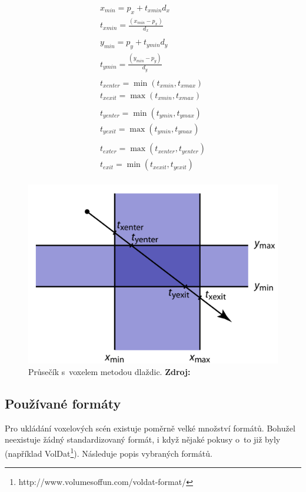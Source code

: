 \begin{equation} \label{eq:slabs}
	\begin{gathered}
		x_{min} = p_x + t_{xmin} d_x\\
		t_{xmin} = \frac{(x_{min} - p_x)}{d_x}\\
		\\
		y_{min} = p_y + t_{ymin} d_y\\
		t_{ymin} = \frac{(y_{min} - p_y)}{d_y}\\
		\\
		t_{xenter} = \min(t_{xmin}, t_{xmax})\\
		t_{xexit} = \max(t_{xmin}, t_{xmax})\\
		\\
		t_{yenter} = \min(t_{ymin}, t_{ymax})\\
		t_{yexit} = \max(t_{ymin}, t_{ymax})\\
		\\
		t_{exter} = \max(t_{xenter}, t_{yenter})\\
		t_{exit} = \min(t_{xexit}, t_{yexit})\\
	\end{gathered}
\end{equation}

\begin{figure}[H]
	\centering
	\includegraphics[scale=1.3]{obrazky-figures/slab_intersect.png}
	\caption{Průsečík s~voxelem metodou dlaždic. \textbf{Zdroj: \cite{Cunha13}}}
	\label{fig:slabs}
\end{figure}


\subsection{Používané formáty}
Pro ukládání voxelových scén existuje poměrně velké množství formátů. Bohužel neexistuje žádný standardizovaný formát, i když nějaké pokusy o~to již byly (například VolDat\footnote{http://www.volumesoffun.com/voldat-format/}). Následuje popis vybraných formátů.

